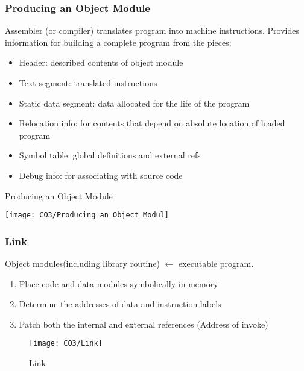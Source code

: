 \subsubsection{Producing an Object Module}
Assembler (or compiler) translates program into machine instructions. Provides information for building a complete program from the pieces:
\begin{itemize}
    \item Header: described contents of object module
    \item Text segment: translated instructions
    \item Static data segment: data allocated for the life of the program
    \item Relocation info: for contents that depend on absolute location of loaded program
    \item Symbol table: global definitions and external refs
    \item Debug info: for associating with source code
\end{itemize}

\begin{table}[!htb]
    \centering
    \caption{Producing an Object Module}
    \texttt{[image: CO3/Producing an Object Modul]}
\end{table}


\subsubsection{Link}
Object modules(including library routine) $\leftarrow$ executable program. 
\begin{enumerate}
    \item Place code and data modules symbolically in memory
    \item Determine the addresses of data and instruction labels
    \item Patch both the internal and external references (Address of invoke)
\end{enumerate}

\begin{figure}[!htb]
    \centering
    \texttt{[image: CO3/Link]}
    \caption{Link}
\end{figure}


